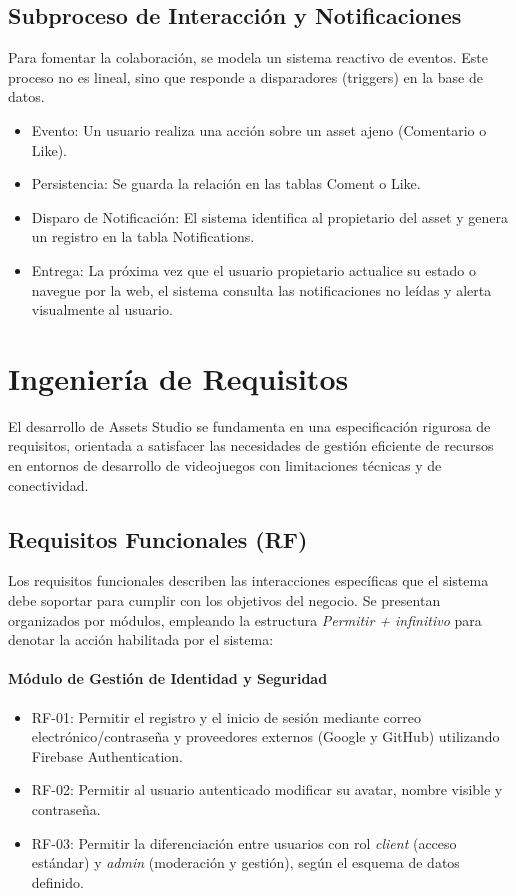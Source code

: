 \subsection{Subproceso de Interacción y Notificaciones}

Para fomentar la colaboración, se modela un sistema reactivo de eventos. Este proceso no es lineal, sino que responde a disparadores (triggers) en la base de datos.

\begin{itemize}
    \item Evento: Un usuario realiza una acción sobre un asset ajeno (Comentario o Like).
    \item Persistencia: Se guarda la relación en las tablas Coment o Like.
    \item Disparo de Notificación: El sistema identifica al propietario del asset y genera un registro en la tabla Notifications.
    \item Entrega: La próxima vez que el usuario propietario actualice su estado o navegue por la web, el sistema consulta las notificaciones no leídas y alerta visualmente al usuario.
\end{itemize}

\section{Ingeniería de Requisitos}
\label{sec:requisitos}

El desarrollo de Assets Studio se fundamenta en una especificación rigurosa de requisitos, orientada a satisfacer las necesidades de gestión eficiente de recursos en entornos de desarrollo de videojuegos con limitaciones técnicas y de conectividad.

\subsection{Requisitos Funcionales (RF)}

Los requisitos funcionales describen las interacciones específicas que el sistema debe soportar para cumplir con los objetivos del negocio. Se presentan organizados por módulos, empleando la estructura \textit{Permitir + infinitivo} para denotar la acción habilitada por el sistema:

\paragraph{Módulo de Gestión de Identidad y Seguridad}
\begin{itemize}
    \item RF-01: Permitir el registro y el inicio de sesión mediante correo electrónico/contraseña y proveedores externos (Google y GitHub) utilizando Firebase Authentication.
    \item RF-02: Permitir al usuario autenticado modificar su avatar, nombre visible y contraseña.
    \item RF-03: Permitir la diferenciación entre usuarios con rol \textit{client} (acceso estándar) y \textit{admin} (moderación y gestión), según el esquema de datos definido.
\end{itemize}

